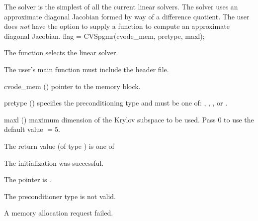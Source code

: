 {
  The {\cvdiag} solver is the simplest of all the current {\cvode} linear solvers. 
  The {\cvdiag} solver uses an approximate diagonal Jacobian formed by way of a
  difference quotient. The user does {\em not} have the option to supply a
  function to compute an approximate diagonal Jacobian.
}
{
  flag = CVSpgmr(cvode\_mem, pretype, maxl);
}
{
  The function  selects the {\cvspgmr} linear solver. 

  The user's main function must include the  header file.
}
{
  \begin{args}
  \item[cvode\_mem] ()
    pointer to the {\cvode} memory block.
  \item[pretype] ()
    specifies the preconditioning type and must be one of: 
    , , , or .
  \item[maxl] ()
    maximum dimension of the Krylov subspace to be used. Pass $0$ to use the 
    default value $=5$.
  \end{args}
}
{
  The return value  (of type ) is one of
  \begin{args}
  \item[\Id{CVSPGMR\_SUCCESS}] 
    The {\cvspgmr} initialization was successful.
  \item[\Id{CVSPGMR\_MEM\_NULL}]
    The  pointer is .
  \item[\Id{CVSPGMR\_ILL\_INPUT}]
    The preconditioner type  is not valid.
  \item[\Id{CVSPGMR\_MEM\_FAIL}]
    A memory allocation request failed.
  \end{args}
}
